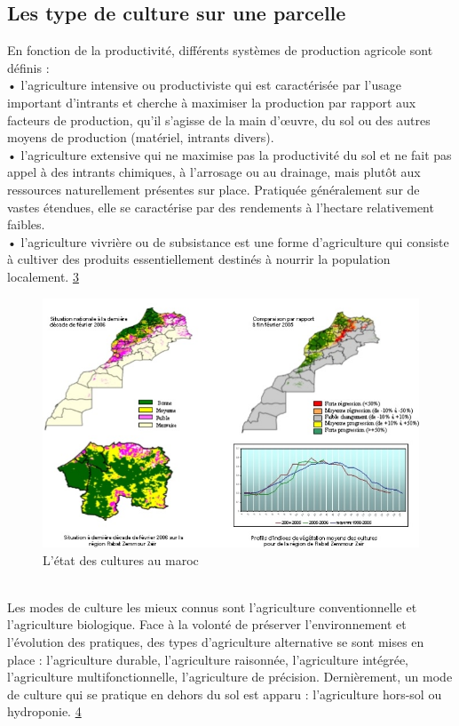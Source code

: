 \documentclass[12pt, openany]{report}
\begin{document}
\subsection{Les type de culture sur une parcelle}
En fonction de la productivité, différents systèmes de production agricole sont définis :\\
• l’agriculture intensive ou productiviste qui est caractérisée par l’usage important d’intrants et cherche à maximiser la production par rapport aux facteurs de production, qu’il s’agisse de la main d’œuvre, du sol ou des autres moyens de production (matériel, intrants divers).\\
• l’agriculture extensive qui ne maximise pas la productivité du sol et ne fait pas appel à des intrants chimiques, à l’arrosage ou au drainage, mais plutôt aux ressources naturellement présentes sur place. Pratiquée généralement sur de vastes étendues, elle se caractérise par des rendements à l’hectare relativement faibles.\\
• l’agriculture vivrière ou de subsistance est une forme d’agriculture qui consiste à cultiver des produits essentiellement destinés à nourrir la population localement. \hyperref[sec:refs]{3} 
\begin{figure}[hp]
\centering
\includegraphics[scale=0.9]{etat.jpg}
\caption{L'état des cultures au maroc}
\end{figure}\\
Les modes de culture les mieux connus sont l’agriculture conventionnelle et l’agriculture biologique. Face à la volonté de préserver l’environnement et l’évolution des pratiques, des types d’agriculture alternative se sont mises en place : l’agriculture durable, l’agriculture raisonnée, l’agriculture intégrée, l’agriculture multifonctionnelle, l’agriculture de précision. Dernièrement, un mode de culture qui se pratique en dehors du sol est apparu : l’agriculture hors-sol ou hydroponie.
\hyperref[sec:refs]{4}
\end{document}

